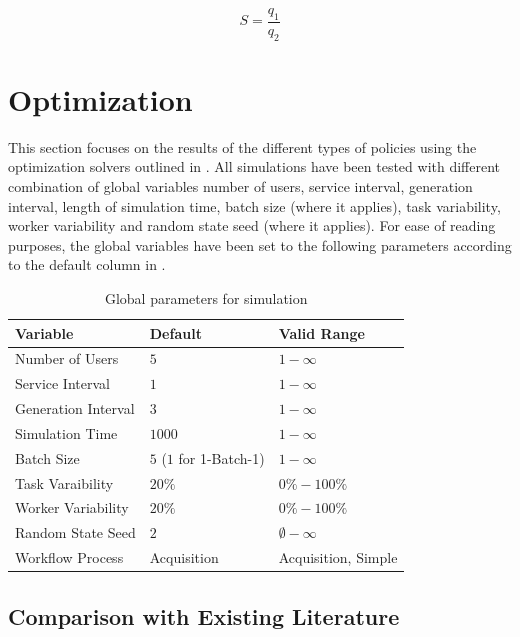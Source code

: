 \documentclass[draft=false]{seal_thesis}
\begin{document}
\begin{equation}
	S=\frac{q_1}{q_2}
\end{equation}

\clearpage

\section{Optimization}
\label{sec:op_results}

This section focuses on the results of the different types of policies using the optimization solvers outlined in . All simulations have been tested with different combination of global variables \ie number of users, service interval, generation interval, length of simulation time, batch size (where it applies), task variability, worker variability and random state seed (where it applies). For ease of reading purposes, the global variables have been set to the following parameters according to the default column in .

\begin{table}[!ht]
\centering
\begin{tabular}{@{}lll@{}}
\toprule
Variable            & Default     & Valid Range \\ \midrule
Number of Users     & $5$           & $1-\infty$      \\
Service Interval    & $1$           & $1-\infty$      \\
Generation Interval & $3$           & $1-\infty$      \\
Simulation Time     & $1000$          & $1-\infty$      \\
Batch Size          & $5$ ($1$ for 1-Batch-1)           & $1-\infty$      \\
Task Varaibility    & $20\%$        & $0\%-100\%$      \\
Worker Variability  & $20\%$        & $0\%-100\%$      \\
Random State Seed   & $2$           & $\emptyset-\infty$      \\
Workflow Process    & Acquisition & Acquisition, Simple      \\ \bottomrule
\end{tabular}
\caption{Global parameters for simulation}
\label{tab:global_parameters_sim}
\end{table}

\subsection{Comparison with Existing Literature}
\label{subsec:opt_comparison}
\end{document}
